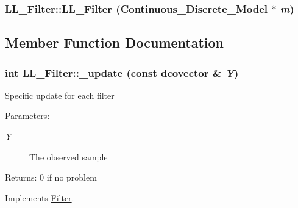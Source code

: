 \hypertarget{class_l_l___filter_a05b72bc41b502dea8abcafc7ff95384}{
\subsubsection[{LL\_\-Filter}]{\setlength{\rightskip}{0pt plus 5cm}LL\_\-Filter::LL\_\-Filter ({\bf Continuous\_\-Discrete\_\-Model} $\ast$ {\em m})}}
\label{class_l_l___filter_a05b72bc41b502dea8abcafc7ff95384}




\subsection{Member Function Documentation}
\hypertarget{class_l_l___filter_ab2b4b545d401d54c66f63a41fa1a99d}{
\subsubsection[{\_\-update}]{\setlength{\rightskip}{0pt plus 5cm}int LL\_\-Filter::\_\-update (const dcovector \& {\em Y})}}
\label{class_l_l___filter_ab2b4b545d401d54c66f63a41fa1a99d}


Specific update for each filter

\begin{Desc}
\item[Parameters:]
\begin{description}
\item[{\em Y}]The observed sample\end{description}
\end{Desc}
\begin{Desc}
\item[Returns:]0 if no problem \end{Desc}


Implements \hyperlink{class_filter_20ecd17fed3b8f11a76c960fe5e7144b}{Filter}.